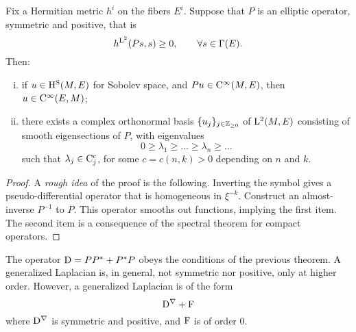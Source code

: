 \begin{theorem}
  Fix a Hermitian metric $h^i$ on the fibers $E^i$.
  Suppose that $P$ is an elliptic operator, symmetric and positive, that is
  \begin{equation*}
    h^{\mathrm{L}^2}(P s, s) \geq 0, \qquad \forall s \in \Gamma(E).
  \end{equation*}
  Then:
  \begin{enumerate}[i)]
    \item if $u \in \mathrm{H}^{\mathrm{S}} (M, E)$ for Sobolev space, and $P u \in \mathrm{C}^\infty (M, E)$, then $u \in \mathrm{C}^\infty(E, M)$;
    \item there exists a complex orthonormal basis $\{ u_j \}_{j \in \mathbb{Z}_{\geq 0}}$ of $\mathrm{L}^2 (M, E)$ consisting of smooth eigensections of $P$, with eigenvalues
          \begin{equation*}
            0 \geq \lambda_1 \geq \dots \geq \lambda_n \geq \dots
          \end{equation*}
          such that $\lambda_j \in \mathrm{C}_j^c$, for some $c = c(n, k) > 0$ depending on $n$ and $k$.
  \end{enumerate}
\end{theorem}

\begin{proof}
  A \textit{rough idea} of the proof is the following. Inverting the symbol gives a pseudo-differential operator that is homogeneous in $\xi^{-k}$.
  Construct an almost-inverse $P^{-1}$ to $P$.
  This operator smooths out functions, implying the first item.
  The second item is a consequence of the spectral theorem for compact operators.
\end{proof}

The operator $\mathrm{D} = P P^* + P^* P$ obeys the conditions of the previous theorem.
A generalized Laplacian is, in general, not symmetric nor positive, only at higher order.
However, a generalized Laplacian is of the form
\begin{equation*}
  \mathrm{D}^\nabla + \mathrm{F}
\end{equation*}
where $\mathrm{D}^\nabla$ is symmetric and positive, and $\mathrm{F}$ is of order $0$.
